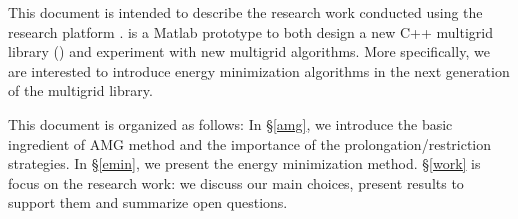 This document is intended to describe the research work conducted using the research platform \muemat.
\muemat is a Matlab prototype to both design a new C++ multigrid library (\mloo) and experiment with new multigrid algorithms.
More specifically, we are interested to introduce energy minimization algorithms in the next generation of the multigrid library.

This document is organized as follows:
In \S\ref{amg}, we introduce the basic ingredient of AMG method and the importance of the prolongation/restriction strategies.
In \S\ref{emin}, we present the energy minimization method. 
\S\ref{work} is focus on the research work: we discuss our main choices, present results to support them and summarize open questions.

